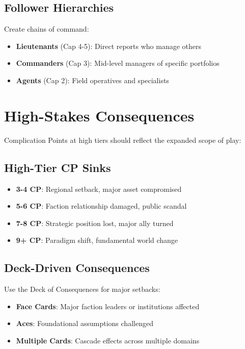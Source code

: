 \subsection*{Follower Hierarchies}

Create chains of command:
\begin{itemize}
    \item \textbf{Lieutenants} (Cap 4-5): Direct reports who manage others
    \item \textbf{Commanders} (Cap 3): Mid-level managers of specific portfolios
    \item \textbf{Agents} (Cap 2): Field operatives and specialists
\end{itemize}

\section{High-Stakes Consequences}

Complication Points at high tiers should reflect the expanded scope of play:

\subsection*{High-Tier CP Sinks}

\begin{itemize}
    \item \textbf{3-4 CP}: Regional setback, major asset compromised
    \item \textbf{5-6 CP}: Faction relationship damaged, public scandal
    \item \textbf{7-8 CP}: Strategic position lost, major ally turned
    \item \textbf{9+ CP}: Paradigm shift, fundamental world change
\end{itemize}

\subsection*{Deck-Driven Consequences}

Use the Deck of Consequences for major setbacks:
\begin{itemize}
    \item \textbf{Face Cards}: Major faction leaders or institutions affected
    \item \textbf{Aces}: Foundational assumptions challenged
    \item \textbf{Multiple Cards}: Cascade effects across multiple domains
\end{itemize}

